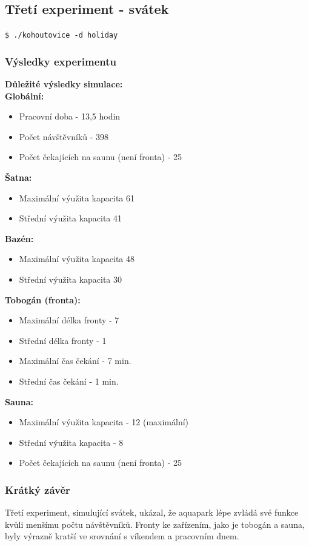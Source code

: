 \documentclass[a4paper, 11pt]{article}
\begin{document}
    \subsection {Třetí experiment - svátek }
    \verb|$ ./kohoutovice -d holiday| 
    \subsubsection{Výsledky experimentu}
    \textbf{Důležité výsledky simulace:}\\
    \textbf{Globální:}
    \begin{itemize}
    \item Pracovní doba - 13,5 hodin
    \item Počet návštěvníků - 398
    \item Počet čekajících na saunu (není fronta) - 25
    \end{itemize}
    \textbf{Šatna:}
    \begin{itemize}
    \item Maximální výužita kapacita 61
    \item Střední výužita kapacita 41
    \end{itemize}
    \textbf{Bazén:}
    \begin{itemize}
    \item Maximální výužita kapacita 48
    \item Střední výužita kapacita 30
    \end{itemize}
    \textbf{Tobogán (fronta):}
    \begin{itemize}
    \item Maximální délka fronty - 7
    \item Střední délka fronty - 1
    \item Maximální čas čekání - 7 min.
    \item Střední čas čekání - 1 min.
    \end{itemize}
    \textbf{Sauna:}
    \begin{itemize}
    \item Maximální výužita kapacita - 12 (maximální)
    \item Střední výužita kapacita - 8
    \item Počet čekajících na saunu (není fronta) - 25
    \end{itemize}
    \subsubsection{Krátký závěr}
    Třetí experiment, simulující svátek, ukázal, že aquapark lépe zvládá své funkce kvůli menšímu počtu návštěvníků. Fronty ke zařízením, jako je tobogán a sauna, byly výrazně kratší ve srovnání s víkendem a pracovním dnem.
\end{document}
